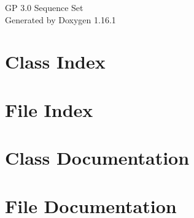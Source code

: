 \documentclass[twoside]{book}
\newcommand{\+}{\discretionary{\mbox{\scriptsize$\hookleftarrow$}}{}{}}
\newcommand{\clearemptydoublepage}{%
    \newpage{\pagestyle{empty}\cleardoublepage}%
  }
\begin{document}
  \raggedbottom
    \hypersetup{pageanchor=false,
                bookmarksnumbered=true,
                pdfencoding=unicode
               }
  \begin{titlepage}
  \vspace*{7cm}
  \begin{center}%
  {\Large GP 3.\+0 Sequence Set}\\
  \vspace*{1cm}
  {\large Generated by Doxygen 1.16.1}\\
  \end{center}
  \end{titlepage}
  \clearemptydoublepage
  \tableofcontents
  \clearemptydoublepage
  \hypersetup{pageanchor=true}
\chapter{Class Index}

\chapter{File Index}

\chapter{Class Documentation}











\chapter{File Documentation}

































  \backmatter
  \newpage
  \clearemptydoublepage
  \printindex
\end{document}
